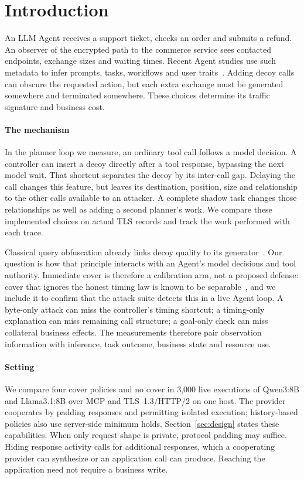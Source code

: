 \section{Introduction}\label{sec:intro}
An LLM Agent receives a support ticket, checks an order and submits a refund. An observer of the encrypted path to the commerce service sees contacted endpoints, exchange sizes and waiting times. Recent Agent studies use such metadata to infer prompts, tasks, workflows and user traits~\cite{jeong2026wra,dangol2026workflow,pouryousef2026traffic,li2026ant}. Adding decoy calls can obscure the requested action, but each extra exchange must be generated somewhere and terminated somewhere. These choices determine its traffic signature and business cost.

\paragraph{The mechanism}
In the planner loop we measure, an ordinary tool call follows a model decision. A controller can insert a decoy directly after a tool response, bypassing the next model wait. That shortcut separates the decoy by its inter-call gap. Delaying the call changes this feature, but leaves its destination, position, size and relationship to the other calls available to an attacker. A complete shadow task changes those relationships as well as adding a second planner's work. We compare these implemented choices on actual TLS records and track the work performed with each trace.

Classical query obfuscation already links decoy quality to its generator~\cite{howe2008trackmenot,peddinti2010trackmenot,balsa2012obpws}. Our question is how that principle interacts with an Agent's model decisions and tool authority. Immediate cover is therefore a calibration arm, not a proposed defense: cover that ignores the honest timing law is known to be separable~\cite{shmatikov2006adaptive,peddinti2010trackmenot}, and we include it to confirm that the attack suite detects this in a live Agent loop. A byte-only attack can miss the controller's timing shortcut; a timing-only explanation can miss remaining call structure; a goal-only check can miss collateral business effects. The measurements therefore pair observation information with inference, task outcome, business state and resource use.



\paragraph{Setting}
We compare four cover policies and no cover in 3,000 live executions of Qwen3:8B and Llama3.1:8B over MCP and TLS~1.3/HTTP/2 on one host. The provider cooperates by padding responses and permitting isolated execution; history-based policies also use server-side minimum holds. Section~\ref{sec:design} states these capabilities. When only request shape is private, protocol padding may suffice. Hiding response activity calls for additional responses, which a cooperating provider can synthesize or an application call can produce. Reaching the application need not require a business write.

